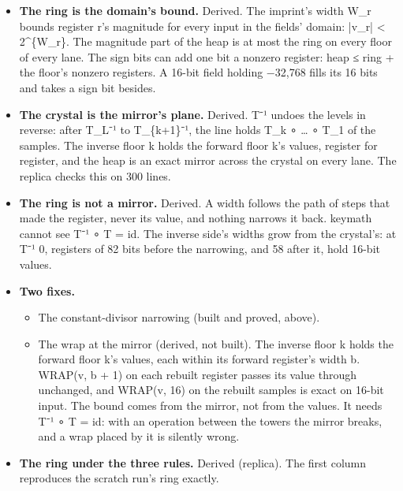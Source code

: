 \begin{itemize}
\begin{itemize}
\item The heap pinches at the crystal by 12× for the ramp, 3.2× at ±8 and 1.3× at ±1,024, and not at all for noise.
\item The live bits peak at the last cut (5,079), not at the crystal (1,656).
\item 128 samples at 7 levels are refused: 93-bit registers overflow the 256-limb file.
\end{itemize}
\item \textbf{The ring is the domain's bound.} Derived. The imprint's width W\_\allowbreak{}r bounds register r's magnitude for every input in the fields' domain: |v\_\allowbreak{}r| < 2\textasciicircum{}\{W\_\allowbreak{}r\}. The magnitude part of the heap is at most the ring on every floor of every lane. The sign bits can add one bit a nonzero register: heap ≤ ring + the floor's nonzero registers. A 16-bit field holding −32,768 fills its 16 bits and takes a sign bit besides.
\item \textbf{The crystal is the mirror's plane.} Derived. T⁻¹ undoes the levels in reverse: after T\_\allowbreak{}L⁻¹ to T\_\allowbreak{}\{k+1\}⁻¹, the line holds T\_\allowbreak{}k ∘ … ∘ T\_\allowbreak{}1 of the samples. The inverse floor k holds the forward floor k's values, register for register, and the heap is an exact mirror across the crystal on every lane. The replica checks this on 300 lines.
\item \textbf{The ring is not a mirror.} Derived. A width follows the path of steps that made the register, never its value, and nothing narrows it back. keymath cannot see T⁻¹ ∘ T = id. The inverse side's widths grow from the crystal's: at T⁻¹ 0, registers of 82 bits before the narrowing, and 58 after it, hold 16-bit values.
\item \textbf{Two fixes.}

\begin{itemize}
\item The constant-divisor narrowing (built and proved, above).
\item The wrap at the mirror (derived, not built). The inverse floor k holds the forward floor k's values, each within its forward register's width b. WRAP(v, b + 1) on each rebuilt register passes its value through unchanged, and WRAP(v, 16) on the rebuilt samples is exact on 16-bit input. The bound comes from the mirror, not from the values. It needs T⁻¹ ∘ T = id: with an operation between the towers the mirror breaks, and a wrap placed by it is silently wrong.
\end{itemize}
\item \textbf{The ring under the three rules.} Derived (replica). The first column reproduces the scratch run's ring exactly.


\end{itemize}
